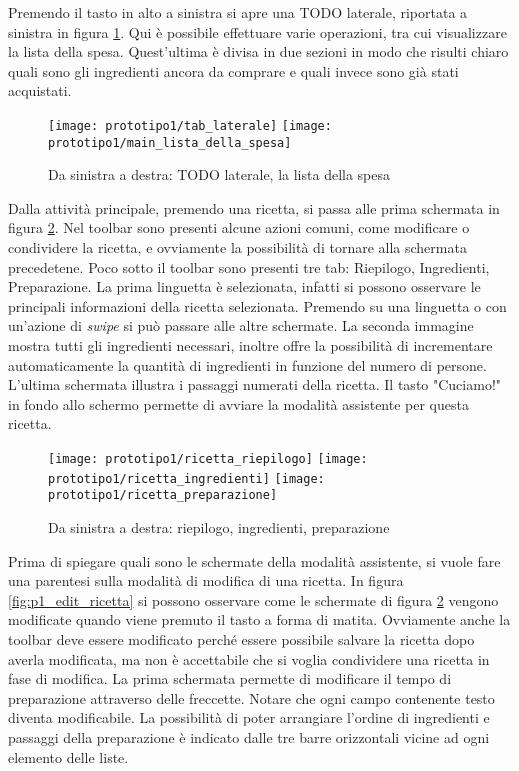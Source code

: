 \clearpage
Premendo il tasto in alto a sinistra si apre una TODO laterale, riportata a sinistra in figura \ref{fig:p1_lista_spesa}.
Qui è possibile effettuare varie operazioni, tra cui visualizzare la lista della spesa.
Quest'ultima è divisa in due sezioni in modo che risulti chiaro quali sono gli ingredienti ancora da comprare e quali invece sono già stati acquistati.

\begin{figure}[ht]
  \begin{center}
    \texttt{[image: prototipo1/tab\_laterale]}
    \texttt{[image: prototipo1/main\_lista\_della\_spesa]}
    \caption{Da sinistra a destra: TODO laterale, la lista della spesa}
    \label{fig:p1_lista_spesa}
  \end{center}
\end{figure}


\clearpage
Dalla attività principale, premendo una ricetta, si passa alle prima schermata in figura \ref{fig:p1_ricetta}.
Nel toolbar sono presenti alcune azioni comuni, come modificare o condividere la ricetta, e ovviamente la possibilità di tornare alla schermata precedetene.
Poco sotto il toolbar sono presenti tre tab: Riepilogo, Ingredienti, Preparazione.
La prima linguetta è selezionata, infatti si possono osservare le principali informazioni della ricetta selezionata.
Premendo su una linguetta o con un'azione di \textit{swipe} si può passare alle altre schermate.
La seconda immagine mostra tutti gli ingredienti necessari, inoltre offre la possibilità di incrementare automaticamente la quantità di ingredienti in funzione del numero di persone.
L'ultima schermata illustra i passaggi numerati della ricetta.
Il tasto "Cuciamo!" in fondo allo schermo permette di avviare la modalità assistente per questa ricetta.

\begin{figure}[ht]
  \begin{center}
    \texttt{[image: prototipo1/ricetta\_riepilogo]}
    \texttt{[image: prototipo1/ricetta\_ingredienti]}
    \texttt{[image: prototipo1/ricetta\_preparazione]}
    \caption{Da sinistra a destra: riepilogo, ingredienti, preparazione}
    \label{fig:p1_ricetta}
  \end{center}
\end{figure}

\clearpage
Prima di spiegare quali sono le schermate della modalità assistente, si vuole fare una parentesi sulla modalità di modifica di una ricetta.
In figura \ref{fig:p1_edit_ricetta} si possono osservare come le schermate di figura \ref{fig:p1_ricetta} vengono modificate quando viene premuto il tasto a forma di matita.
Ovviamente anche la toolbar deve essere modificato perché essere possibile salvare la ricetta dopo averla modificata, ma non è accettabile che si voglia condividere una ricetta in fase di modifica.
La prima schermata permette di modificare il tempo di preparazione attraverso delle freccette.
Notare che ogni campo contenente testo diventa modificabile.
La possibilità di poter arrangiare l'ordine di ingredienti e passaggi della preparazione è indicato dalle tre barre orizzontali vicine ad ogni elemento delle liste.

